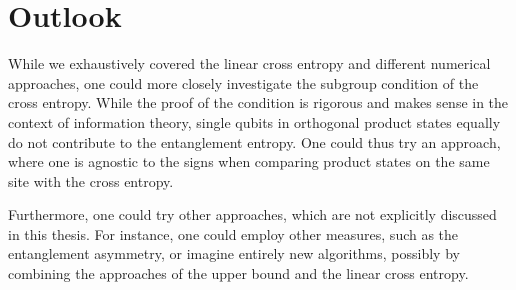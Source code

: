 \section*{Outlook}

While we exhaustively covered the linear cross entropy and different numerical
approaches, one could more closely investigate the subgroup condition of the
cross entropy. While the proof of the condition is rigorous and makes sense in
the context of information theory, single qubits in orthogonal product states
equally do not contribute to the entanglement entropy. One could thus try an
approach, where one is agnostic to the signs when comparing product states on
the same site with the cross entropy.

Furthermore, one could try other approaches, which are not explicitly discussed
in this thesis. For instance, one could employ other measures, such as the
entanglement asymmetry, or imagine entirely new algorithms, possibly by
combining the approaches of the upper bound and the linear cross entropy.

